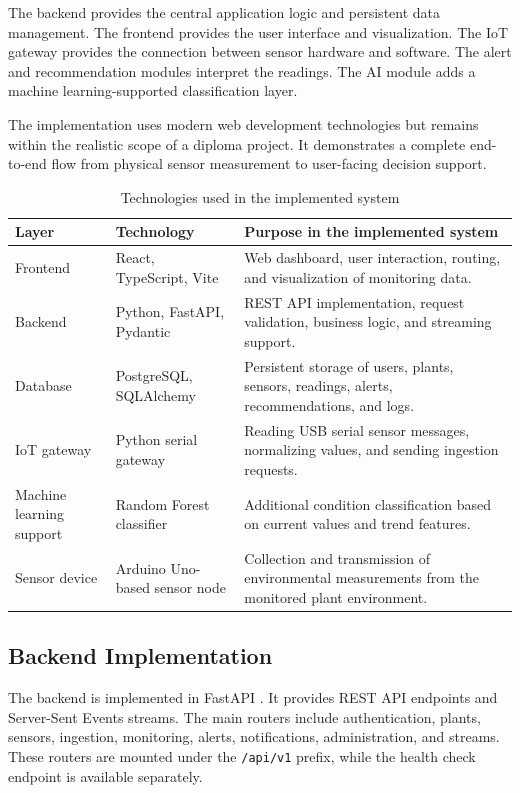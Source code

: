 The backend provides the central application logic and persistent data management. The frontend provides the user interface and visualization. The IoT gateway provides the connection between sensor hardware and software. The alert and recommendation modules interpret the readings. The AI module adds a machine learning-supported classification layer.

The implementation uses modern web development technologies but remains within the realistic scope of a diploma project. It demonstrates a complete end-to-end flow from physical sensor measurement to user-facing decision support.

\begin{table}[H]
\centering
\caption{Technologies used in the implemented system}
\label{tab:technologies-used}
\begin{tabular}{p{}p{}p{}}
\hline
\textbf{Layer} & \textbf{Technology} & \textbf{Purpose in the implemented system} \\
\hline
Frontend & React, TypeScript, Vite & Web dashboard, user interaction, routing, and visualization of monitoring data. \\
Backend & Python, FastAPI, Pydantic & REST API implementation, request validation, business logic, and streaming support. \\
Database & PostgreSQL, SQLAlchemy & Persistent storage of users, plants, sensors, readings, alerts, recommendations, and logs. \\
IoT gateway & Python serial gateway & Reading USB serial sensor messages, normalizing values, and sending ingestion requests. \\
Machine learning support & Random Forest classifier & Additional condition classification based on current values and trend features. \\
Sensor device & Arduino Uno-based sensor node & Collection and transmission of environmental measurements from the monitored plant environment. \\
\hline
\end{tabular}
\end{table}

\subsection{Backend Implementation}
\label{subsec:backend-implementation}

The backend is implemented in FastAPI \cite{fastapi2025docs}. It provides REST API endpoints and Server-Sent Events streams. The main routers include authentication, plants, sensors, ingestion, monitoring, alerts, notifications, administration, and streams. These routers are mounted under the \texttt{/api/v1} prefix, while the health check endpoint is available separately.

